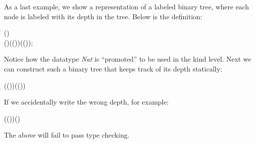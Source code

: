 As a last example, we show a representation of a labeled binary tree,
where each node is labeled with its depth in the tree. Below is the
definition:
\begin{hscode}\SaveRestoreHook
{}%
%
%
%
\>[3]{}\;\;(\mathbin{:})\mathrel{=}\<[E]%
\\
\>[3]{}\<[5]%
\>[5]{}\mid {}\;(\mathbin{:})\;(\mathbin{:}\;(\;))\;(\mathbin{:}\;(\;));{}\<[E]%
\ColumnHook
\end{hscode}\resethooks
Notice how the datatype \emph{Nat} is ``promoted'' to be used in the
kind level. Next we can construct such a binary tree that keeps track
of its depth statically:\begin{hscode}\SaveRestoreHook
{}%
%
%
\>[3]{}\;\;\;(\;(\;))\;(\;(\;)){}\<[E]%
\ColumnHook
\end{hscode}\resethooks
If we accidentally write the wrong depth, for example:\begin{hscode}\SaveRestoreHook
{}%
%
%
\>[3]{}\;\;\;(\;(\;))\;(\;){}\<[E]%
\ColumnHook
\end{hscode}\resethooks
The above will fail to pass type checking.

  

 
